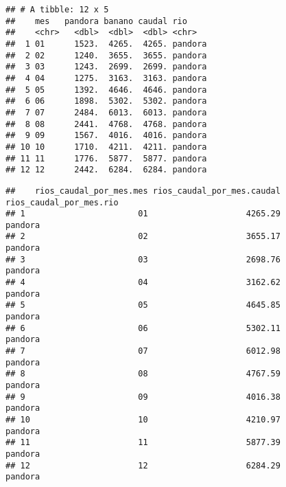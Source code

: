 \documentclass[
]{article}
\newenvironment{Shaded}{\begin{snugshade}}{\end{snugshade}}
\newcommand{\FunctionTok}[1]{\textcolor[rgb]{0.00,0.00,0.00}{#1}}
\newcommand{\NormalTok}[1]{#1}
\newcommand{\OtherTok}[1]{\textcolor[rgb]{0.56,0.35,0.01}{#1}}
\newcommand{\SpecialCharTok}[1]{\textcolor[rgb]{0.00,0.00,0.00}{#1}}
\newcommand{\StringTok}[1]{\textcolor[rgb]{0.31,0.60,0.02}{#1}}
\begin{document}
\begin{verbatim}
## # A tibble: 12 x 5
##    mes   pandora banano caudal rio    
##    <chr>   <dbl>  <dbl>  <dbl> <chr>  
##  1 01      1523.  4265.  4265. pandora
##  2 02      1240.  3655.  3655. pandora
##  3 03      1243.  2699.  2699. pandora
##  4 04      1275.  3163.  3163. pandora
##  5 05      1392.  4646.  4646. pandora
##  6 06      1898.  5302.  5302. pandora
##  7 07      2484.  6013.  6013. pandora
##  8 08      2441.  4768.  4768. pandora
##  9 09      1567.  4016.  4016. pandora
## 10 10      1710.  4211.  4211. pandora
## 11 11      1776.  5877.  5877. pandora
## 12 12      2442.  6284.  6284. pandora
\end{verbatim}

\begin{Shaded}
\end{Shaded}

\begin{verbatim}
##    rios_caudal_por_mes.mes rios_caudal_por_mes.caudal rios_caudal_por_mes.rio
## 1                       01                    4265.29                 pandora
## 2                       02                    3655.17                 pandora
## 3                       03                    2698.76                 pandora
## 4                       04                    3162.62                 pandora
## 5                       05                    4645.85                 pandora
## 6                       06                    5302.11                 pandora
## 7                       07                    6012.98                 pandora
## 8                       08                    4767.59                 pandora
## 9                       09                    4016.38                 pandora
## 10                      10                    4210.97                 pandora
## 11                      11                    5877.39                 pandora
## 12                      12                    6284.29                 pandora
\end{verbatim}

\begin{Shaded}
\end{Shaded}
\end{document}

